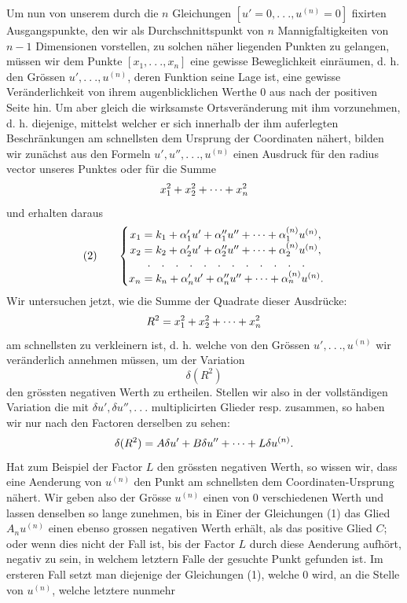 \indent Um nun von unserem durch die \(n\) Gleichungen \([u'=0,.\ .\ .,u^{(n)}=0]\) fixirten Ausgangspunkte, den wir als Durchschnittspunkt von \(n\) Mannigfaltigkeiten von \(n-1\) Dimensionen vorstellen, zu solchen näher liegenden Punkten zu gelangen, müssen wir dem Punkte \([x_1,.\ .\ .,x_n]\) eine gewisse Beweglichkeit einräumen, d. h. den Grössen \(u',.\ .\ .,u^{(n)}\), deren Funktion seine Lage ist, eine
\clearpage{}
\noindent gewisse Veränderlichkeit von ihrem augenblicklichen Werthe 0 aus nach der positiven Seite hin. Um aber gleich die wirksamste Ortsveränderung mit ihm vorzunehmen, d. h. diejenige, mittelst welcher er sich innerhalb der ihm auferlegten Beschränkungen am schnellsten dem Ursprung der Coordinaten nähert, bilden wir zunächst aus den Formeln \(u',u'',.\ .\ .,u^{(n)}\) einen Ausdruck für den radius vector unseres Punktes oder für die Summe
\[
x_1^2+x_2^2+\mathinner{\cdotp\cdotp\cdotp}+x_n^2
\]
\noindent und erhalten daraus
\[
\begin{array}{@{}l@{\qquad}l@{}}
(2)&\left\{\begin{array}{@{}r@{}l@{}}
x_1={}&k_1+\alpha_1'u'+\alpha_1''u''+\mathinner{\cdotp\cdotp\cdotp}+\alpha_1^{(n)}u^{(n)},\\
x_2={}&k_2+\alpha_2'u'+\alpha_2''u''+\mathinner{\cdotp\cdotp\cdotp}+\alpha_2^{(n)}u^{(n)},\\
\multicolumn{2}{c}{.\quad .\quad .\quad .\quad .\quad .\quad .\quad .\quad .\quad .\quad .\quad .}\\
x_n={}&k_n+\alpha_n'u'+\alpha_n''u''+\mathinner{\cdotp\cdotp\cdotp}+\alpha_n^{(n)}u^{(n)}.
\end{array}\right.
\end{array}
\]
\indent Wir untersuchen jetzt, wie die Summe der Quadrate dieser Ausdrücke:
\[
R^2=x_1^2+x_2^2+\mathinner{\cdotp\cdotp\cdotp}+x_n^2
\]
\noindent am schnellsten zu verkleinern ist, d. h. welche von den Grössen \(u',.\ .\ .,u^{(n)}\) wir veränderlich annehmen müssen, um der Variation
\[
\delta(R^2)
\]
\noindent den grössten negativen Werth zu ertheilen. Stellen wir also in der vollständigen Variation die mit \(\delta u',\delta u'',.\ .\ .\) multiplicirten Glieder resp. zusammen, so haben wir nur nach den Factoren derselben zu sehen:
\[
\delta(R^2)=A\delta u'+B\delta u''+\mathinner{\cdotp\cdotp\cdotp}+L\delta u^{(n)}.
\]
\noindent Hat zum Beispiel der Factor \(L\) den grössten negativen Werth, so wissen wir, dass eine Aenderung von \(u^{(n)}\) den Punkt am schnellsten dem Coordinaten-Ursprung nähert. Wir geben also der Grösse \(u^{(n)}\) einen von 0 verschiedenen Werth und lassen denselben so lange zunehmen, bis in Einer der Gleichungen (1) das Glied \(A_nu^{(n)}\) einen ebenso grossen negativen Werth erhält, als das positive Glied \(C\); oder wenn dies nicht der Fall ist, bis der Factor \(L\) durch diese Aenderung aufhört, negativ zu sein, in welchem letztern Falle der gesuchte Punkt gefunden ist. Im ersteren Fall setzt man diejenige der Gleichungen (1), welche 0 wird, an die Stelle von \(u^{(n)}\), welche letztere nunmehr

